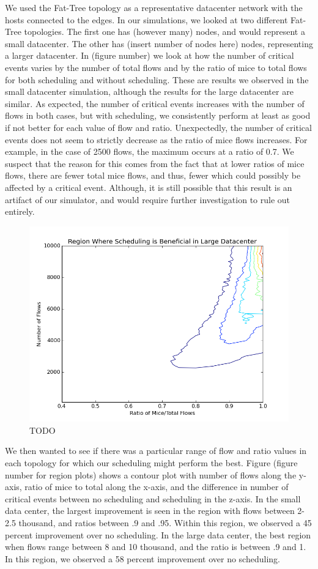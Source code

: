 We used the Fat-Tree topology \cite{fattree} as a representative datacenter
network with the hosts connected to the edges. In our simulations, we looked at
two different Fat-Tree topologies. The first one has (however many) nodes, and
would represent a small datacenter. The other has (insert number of nodes here)
nodes, representing a larger datacenter. In (figure number) we look at how the
number of critical events varies by the number of total flows and by the ratio
of mice to total flows for both scheduling and without scheduling. These are
results we observed in the small datacenter simulation, although the results
for the large datacenter are similar. As expected, the number of critical events
increases with the number of flows in both cases, but with scheduling, we 
consistently perform at least as good if not better for each value of flow and
ratio. Unexpectedly, the number of critical events does not seem to strictly
decrease as the ratio of mice flows increases. For example, in the case of 2500
flows, the maximum occurs at a ratio of 0.7. We suspect that the reason for this
comes from the fact that at lower ratios of mice flows, there are fewer total
mice flows, and thus, fewer which could possibly be affected by a critical
event. Although, it is still possible that this result is an artifact of our
simulator, and would require further investigation to rule out entirely.
\begin{figure}[H]
	\centering
	\includegraphics[width=\columnwidth]{large_datacenter.png}
	\caption{TODO}
	\label{fig:largedc}
\end{figure}

We then wanted to see if there was a particular range of flow and ratio values
in each topology for which our scheduling might perform the best. Figure
(figure number for region plots) shows a contour plot with number of flows along
the y-axis, ratio of mice to total along the x-axis, and the difference in
number of critical events between no scheduling and scheduling in the z-axis. In
the small data center, the largest improvement is seen in the region with flows
between 2-2.5 thousand, and ratios between .9 and .95. Within this region, we
observed a 45 percent improvement over no scheduling. In the large data center,
the best region when flows range between 8 and 10 thousand, and the ratio is
between .9 and 1. In this region, we observed a 58 percent improvement over no
scheduling.
